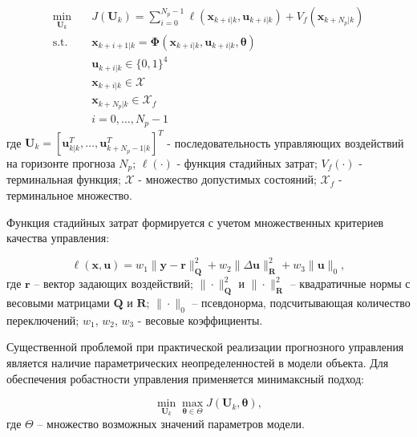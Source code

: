 \begin{equation}
	\begin{aligned}
		\min_{\mathbf{U}_k} \quad & J(\mathbf{U}_k) = \sum_{i=0}^{N_p-1} \ell(\mathbf{x}_{k+i|k}, \mathbf{u}_{k+i|k}) + V_f(\mathbf{x}_{k+N_p|k}) \\
		\text{s.t.} \quad         & \mathbf{x}_{k+i+1|k} = \boldsymbol{\Phi}(\mathbf{x}_{k+i|k}, \mathbf{u}_{k+i|k}, \boldsymbol{\theta})         \\
		                          & \mathbf{u}_{k+i|k} \in \{0,1\}^4                                                                              \\
		                          & \mathbf{x}_{k+i|k} \in \mathcal{X}                                                                            \\
		                          & \mathbf{x}_{k+N_p|k} \in \mathcal{X}_f                                                                        \\
		                          & i = 0,\ldots,N_p-1
	\end{aligned}
\end{equation}
где $\mathbf{U}_k = [\mathbf{u}_{k|k}^T, \ldots, \mathbf{u}_{k+N_p-1|k}^T]^T$ - последовательность управляющих воздействий на горизонте прогноза $N_p$;
$\ell(\cdot)$ - функция стадийных затрат;
$V_f(\cdot)$ - терминальная функция;
$\mathcal{X}$ - множество допустимых состояний;
$\mathcal{X}_f$ - терминальное множество.

Функция стадийных затрат формируется с учетом множественных критериев качества управления:

\begin{equation}
	\ell(\mathbf{x}, \mathbf{u}) = w_1\|\mathbf{y} - \mathbf{r}\|_{\mathbf{Q}}^2 + w_2\|\Delta\mathbf{u}\|_{\mathbf{R}}^2 + w_3\|\mathbf{u}\|_0,
\end{equation}
где $\mathbf{r}$ -- вектор задающих воздействий;
$\|\cdot\|_{\mathbf{Q}}^2$ и $\|\cdot\|_{\mathbf{R}}^2$ -- квадратичные нормы с весовыми матрицами $\mathbf{Q}$ и $\mathbf{R}$;
$\|\cdot\|_0$ -- псевдонорма, подсчитывающая количество переключений;
$w_1$, $w_2$, $w_3$ - весовые коэффициенты.

Существенной проблемой при практической реализации прогнозного управления является наличие параметрических неопределенностей
в модели объекта. Для обеспечения робастности управления применяется минимаксный подход:

\begin{equation}
	\min_{\mathbf{U}_k} \max_{\boldsymbol{\theta} \in \Theta} J(\mathbf{U}_k, \boldsymbol{\theta}),
\end{equation}
где $\Theta$ -- множество возможных значений параметров модели.

